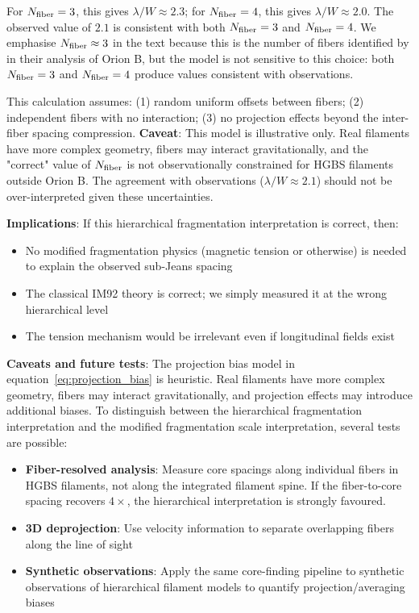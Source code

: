 \documentclass[11pt,a4paper]{article}
\begin{document}
For $N_{\rm fiber} = 3$, this gives $\lambda/W \approx 2.3$; for $N_{\rm fiber} = 4$, this gives $\lambda/W \approx 2.0$. The observed value of $2.1$ is consistent with both $N_{\rm fiber} = 3$ and $N_{\rm fiber} = 4$. We emphasise $N_{\rm fiber} \approx 3$ in the text because this is the number of fibers identified by \citet{Yang2024} in their analysis of Orion B, but the model is not sensitive to this choice: both $N_{\rm fiber} = 3$ and $N_{\rm fiber} = 4$ produce values consistent with observations.

This calculation assumes: (1) random uniform offsets between fibers; (2) independent fibers with no interaction; (3) no projection effects beyond the inter-fiber spacing compression. \textbf{Caveat}: This model is illustrative only. Real filaments have more complex geometry, fibers may interact gravitationally, and the "correct" value of $N_{\rm fiber}$ is not observationally constrained for HGBS filaments outside Orion B. The agreement with observations ($\lambda/W \approx 2.1$) should not be over-interpreted given these uncertainties.

\textbf{Implications}: If this hierarchical fragmentation interpretation is correct, then:
\begin{itemize}
    \item No modified fragmentation physics (magnetic tension or otherwise) is needed to explain the observed sub-Jeans spacing
    \item The classical IM92 theory is correct; we simply measured it at the wrong hierarchical level
    \item The tension mechanism would be irrelevant even if longitudinal fields exist
\end{itemize}

\textbf{Caveats and future tests}: The projection bias model in equation~\ref{eq:projection_bias} is heuristic. Real filaments have more complex geometry, fibers may interact gravitationally, and projection effects may introduce additional biases. To distinguish between the hierarchical fragmentation interpretation and the modified fragmentation scale interpretation, several tests are possible:
\begin{itemize}
    \item \textbf{Fiber-resolved analysis}: Measure core spacings along individual fibers in HGBS filaments, not along the integrated filament spine. If the fiber-to-core spacing recovers $4\times$, the hierarchical interpretation is strongly favoured.
    \item \textbf{3D deprojection}: Use velocity information to separate overlapping fibers along the line of sight
    \item \textbf{Synthetic observations}: Apply the same core-finding pipeline to synthetic observations of hierarchical filament models to quantify projection/averaging biases
\end{itemize}
\end{document}
